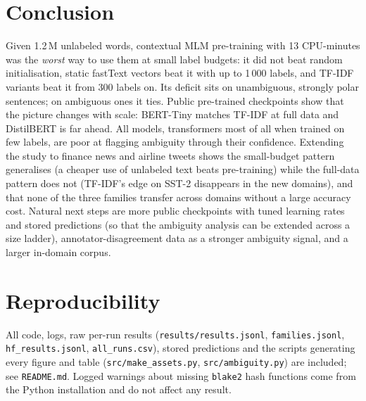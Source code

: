 \documentclass[11pt,a4paper]{article}
\begin{document}
\section{Conclusion}
Given 1.2\,M unlabeled words, contextual MLM pre-training with 13 CPU-minutes was the \emph{worst} way to use them at small label budgets: it did not beat random initialisation, static fastText vectors beat it with up to 1\,000 labels, and TF-IDF variants beat it from 300 labels on.
Its deficit sits on unambiguous, strongly polar sentences; on ambiguous ones it ties. Public pre-trained checkpoints show that the picture changes with scale: BERT-Tiny matches TF-IDF at full data and DistilBERT is far ahead.
All models, transformers most of all when trained on few labels, are poor at flagging ambiguity through their confidence. Extending the study to finance news and airline tweets shows the small-budget pattern generalises (a cheaper use of unlabeled text beats pre-training) while the full-data pattern does not (TF-IDF's edge on SST-2 disappears in the new domains), and that none of the three families transfer across domains without a large accuracy cost. Natural next steps are more public checkpoints with tuned learning rates and stored predictions (so that the ambiguity analysis can be extended across a size ladder), annotator-disagreement data as a stronger ambiguity signal, and a larger in-domain corpus.

\section*{Reproducibility}
All code, logs, raw per-run results (\texttt{results/results.jsonl}, \texttt{families.jsonl}, \texttt{hf\_results.jsonl}, \texttt{all\_runs.csv}), stored predictions and the scripts generating every figure and table (\texttt{src/make\_assets.py}, \texttt{src/ambiguity.py}) are included; see \texttt{README.md}.
Logged warnings about missing \texttt{blake2} hash functions come from the Python installation and do not affect any result.



\end{document}
